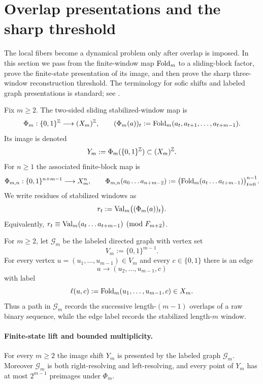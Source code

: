 ﻿\section{Overlap presentations and the sharp threshold}\label{sec:stab:conjugacy}

The local fibers become a dynamical problem only after overlap is imposed.  In
this section we pass from the finite-window map $\mathrm{Fold}_m$ to a sliding-block
factor, prove the finite-state presentation of its image, and then prove the
sharp three-window reconstruction threshold.  The terminology for sofic shifts
and labeled graph presentations is standard; see
\cite{LindMarcus1995,Kitchens1998,Nasu1995}.

\begin{definition}\label{def:Phi}
Fix $m\ge 2$.  The two-sided sliding stabilized-window map is
\[
\Phi_m:\{0,1\}^{\mathbb{Z}}\longrightarrow (X_m)^{\mathbb{Z}},
\qquad
(\Phi_m(a))_t:=\mathrm{Fold}_m(a_t,a_{t+1},\ldots,a_{t+m-1}).
\]
Its image is denoted
\[
Y_m:=\Phi_m(\{0,1\}^{\mathbb{Z}})\subset (X_m)^{\mathbb{Z}}.
\]
For $n\ge 1$ the associated finite-block map is
\[
\Phi_{m,n}:\{0,1\}^{n+m-1}\longrightarrow X_m^n,
\qquad
\Phi_{m,n}(a_0\ldots a_{n+m-2})
:=
\bigl(\mathrm{Fold}_m(a_t\ldots a_{t+m-1})\bigr)_{t=0}^{n-1}.
\]
We write residues of stabilized windows as
\[
r_t:=\mathrm{Val}_m\bigl((\Phi_m(a))_t\bigr).
\]
Equivalently,
$r_t\equiv\mathrm{Val}_m(a_t\ldots a_{t+m-1})\pmod {F_{m+2}}$.
\end{definition}

\begin{definition}\label{def:overlap-graph}
For $m\ge2$, let $\mathcal G_m$ be the labeled directed graph with vertex set
\[
V_m:=\{0,1\}^{m-1}.
\]
For every vertex $u=(u_1,\ldots,u_{m-1})\in V_m$ and every
$c\in\{0,1\}$ there is an edge
\[
u\longrightarrow (u_2,\ldots,u_{m-1},c)
\]
with label
\[
\ell(u,c):=\mathrm{Fold}_m(u_1,\ldots,u_{m-1},c)\in X_m.
\]
Thus a path in $\mathcal G_m$ records the successive length-$(m-1)$ overlaps
of a raw binary sequence, while the edge label records the stabilized
length-$m$ window.
\end{definition}

\paragraph{Finite-state lift and bounded multiplicity.}\label{thm:finite-state-lift}
For every $m\ge2$ the image shift $Y_m$ is presented by the labeled graph
$\mathcal G_m$.  Moreover $\mathcal G_m$ is both right-resolving and
left-resolving, and every point of $Y_m$ has at most $2^{m-1}$ preimages under
$\Phi_m$.


